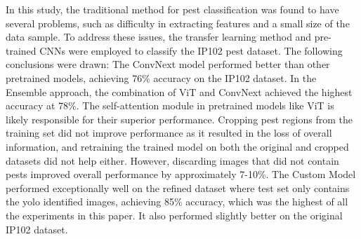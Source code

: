 In this study, the traditional method for pest classification was found to have several problems, such as difficulty in extracting features and a small size of the data sample. To address these issues, the transfer learning method and pre-trained CNNs were employed to classify the IP102 pest dataset. The following conclusions were drawn: The ConvNext model performed better than other pretrained models, achieving 76\% accuracy on the IP102 dataset. In the Ensemble approach, the combination of ViT and ConvNext achieved the highest accuracy at 78\%. The self-attention module in pretrained models like ViT is likely responsible for their superior performance. Cropping pest regions from the training set did not improve performance as it resulted in the loss of overall information, and retraining the trained model on both the original and cropped datasets did not help either. However, discarding images that did not contain pests improved overall performance by approximately 7-10\%. The Custom Model performed exceptionally well on the refined dataset where test set only contains the yolo identified images, achieving 85\% accuracy, which was the highest of all the experiments in this paper. It also performed slightly better on the original IP102 dataset.
 
